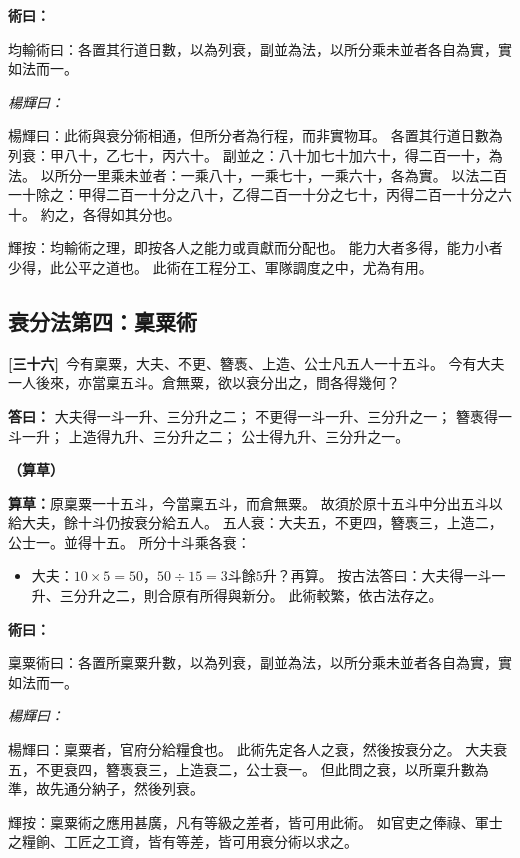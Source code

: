 \documentclass[11pt,a4paper]{article}
\newenvironment{method}{%
  \par\noindent\textcolor{methodcolor}{\textbf{術曰：}}%
  \ignorespaces
}{\par\vspace{0.5em}}
\newenvironment{caocao}{%
  \par\noindent\textcolor{caocaocolor}{\small\textbf{（算草）}}%
  \ignorespaces
}{\par\vspace{0.5em}}
\newenvironment{yanghuicomment}{%
  \par\noindent\textcolor{commentarycolor}{\small\textit{楊輝曰：}}%
  \ignorespaces
}{\par\vspace{0.5em}}
\newcommand{\problemnum}[1]{\textbf{[\ignorespaces#1\unskip]}}
\begin{document}
\begin{method}
均輸術曰：各置其行道日數，以為列衰，副並為法，以所分乘未並者各自為實，實如法而一。
\end{method}

\begin{yanghuicomment}
楊輝曰：此術與衰分術相通，但所分者為行程，而非實物耳。
各置其行道日數為列衰：甲八十，乙七十，丙六十。
副並之：八十加七十加六十，得二百一十，為法。
以所分一里乘未並者：一乘八十，一乘七十，一乘六十，各為實。
以法二百一十除之：甲得二百一十分之八十，乙得二百一十分之七十，丙得二百一十分之六十。
約之，各得如其分也。

輝按：均輸術之理，即按各人之能力或貢獻而分配也。
能力大者多得，能力小者少得，此公平之道也。
此術在工程分工、軍隊調度之中，尤為有用。
\end{yanghuicomment}

\subsection{衰分法第四：稟粟術}

\noindent\problemnum{三十六}\,
今有稟粟，大夫、不更、簪褭、上造、公士凡五人一十五斗。
今有大夫一人後來，亦當稟五斗。倉無粟，欲以衰分出之，問各得幾何？

\noindent\textcolor{answercolor}{\textbf{答曰：}}
大夫得一斗一升、三分升之二；
不更得一斗一升、三分升之一；
簪褭得一斗一升；
上造得九升、三分升之二；
公士得九升、三分升之一。

\begin{caocao}
\textbf{算草：}原稟粟一十五斗，今當稟五斗，而倉無粟。
故須於原十五斗中分出五斗以給大夫，餘十斗仍按衰分給五人。
五人衰：大夫五，不更四，簪褭三，上造二，公士一。並得十五。
所分十斗乘各衰：
\begin{itemize}[leftmargin=3em]
\item 大夫：$10 \times 5 = 50$，$50 \div 15 = 3$斗餘$5$升？再算。
按古法答曰：大夫得一斗一升、三分升之二，則合原有所得與新分。
此術較繁，依古法存之。
\end{itemize}
\end{caocao}

\begin{method}
稟粟術曰：各置所稟粟升數，以為列衰，副並為法，以所分乘未並者各自為實，實如法而一。
\end{method}

\begin{yanghuicomment}
楊輝曰：稟粟者，官府分給糧食也。
此術先定各人之衰，然後按衰分之。
大夫衰五，不更衰四，簪褭衰三，上造衰二，公士衰一。
但此問之衰，以所稟升數為準，故先通分納子，然後列衰。

輝按：稟粟術之應用甚廣，凡有等級之差者，皆可用此術。
如官吏之俸祿、軍士之糧餉、工匠之工資，皆有等差，皆可用衰分術以求之。
\end{yanghuicomment}
\end{document}
